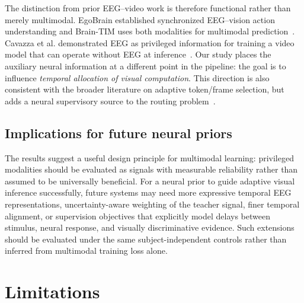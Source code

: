 \documentclass[runningheads]{llncs}
\begin{document}
The distinction from prior EEG--video work is therefore functional rather than merely multimodal. EgoBrain established synchronized EEG--vision action understanding and Brain-TIM uses both modalities for multimodal prediction~\cite{lin2026egobrain}. Cavazza et al. demonstrated EEG as privileged information for training a video model that can operate without EEG at inference~\cite{cavazza2022actions}. Our study places the auxiliary neural information at a different point in the pipeline: the goal is to influence \emph{temporal allocation of visual computation}. This direction is also consistent with the broader literature on adaptive token/frame selection, but adds a neural supervisory source to the routing problem~\cite{ryoo2021tokenlearner,rao2021dynamicvit,wang2022adafocusv2,fu2025framefusion,li2026adaptok}.

\subsection{Implications for future neural priors}

The results suggest a useful design principle for multimodal learning: privileged modalities should be evaluated as signals with measurable reliability rather than assumed to be universally beneficial. For a neural prior to guide adaptive visual inference successfully, future systems may need more expressive temporal EEG representations, uncertainty-aware weighting of the teacher signal, finer temporal alignment, or supervision objectives that explicitly model delays between stimulus, neural response, and visually discriminative evidence. Such extensions should be evaluated under the same subject-independent controls rather than inferred from multimodal training loss alone.

\section{Limitations}
\end{document}
